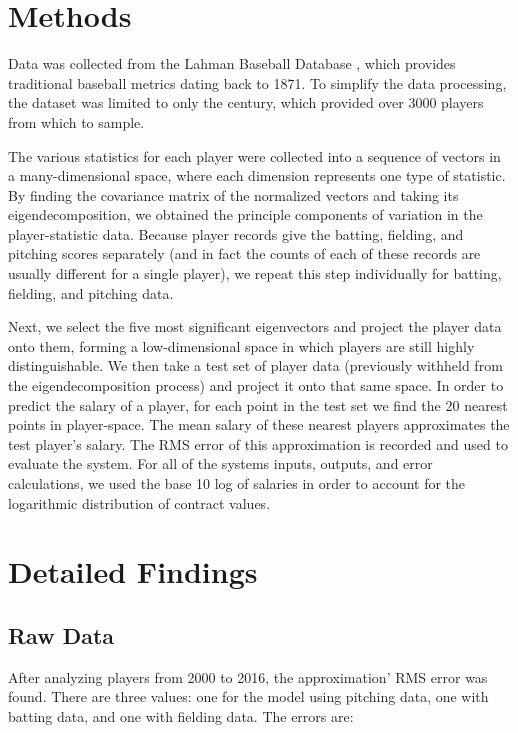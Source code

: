 \documentclass[12pt, letterpaper]{article}
\begin{document}
\section{Methods}
Data was collected from the Lahman Baseball Database \cite{lahman}, which provides traditional baseball metrics dating back to 1871. To simplify the data processing, the dataset was limited to only the  century, which provided over 3000 players from which to sample.
\par The various statistics for each player were collected into a sequence of vectors in a many-dimensional space, where each dimension represents one type of statistic. By finding the covariance matrix of the normalized vectors and taking its eigendecomposition, we obtained the principle components of variation in the player-statistic data. Because player records give the batting, fielding, and pitching scores separately (and in fact the counts of each of these records are usually different for a single player), we repeat this step individually for batting, fielding, and pitching data.
\par Next, we select the five most significant eigenvectors and project the player data onto them, forming a low-dimensional space in which players are still highly distinguishable. We then take a test set of player data (previously withheld from the eigendecomposition process) and project it onto that same space. In order to predict the salary of a player, for each point in the test set we find the 20 nearest points in player-space. The mean salary of these nearest players approximates the test player's salary. The RMS error of this approximation is recorded and used to evaluate the system. For all of the systems inputs, outputs, and error calculations, we used the base 10 log of salaries in order to account for the logarithmic distribution of contract values.

\section{Detailed Findings}

\subsection{Raw Data}
After analyzing players from 2000 to 2016, the approximation' RMS error was found. There are three values: one for the model using pitching data, one with batting data, and one with fielding data. The errors are:
\end{document}

